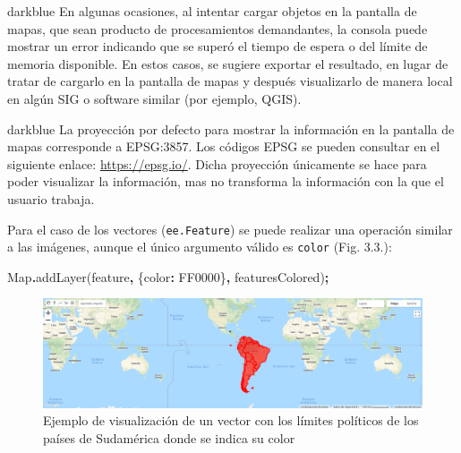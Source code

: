 \documentclass[
  12pt,
  letterpaper,
  twoside]{book}
\newenvironment{Shaded}{\begin{snugshade}}{\end{snugshade}}
\newcommand{\BuiltInTok}[1]{#1}
\newcommand{\DataTypeTok}[1]{\textcolor[rgb]{0.13,0.29,0.53}{#1}}
\newcommand{\FunctionTok}[1]{\textcolor[rgb]{0.00,0.00,0.00}{#1}}
\newcommand{\NormalTok}[1]{#1}
\newcommand{\OperatorTok}[1]{\textcolor[rgb]{0.81,0.36,0.00}{\textbf{#1}}}
\newcommand{\StringTok}[1]{\textcolor[rgb]{0.31,0.60,0.02}{#1}}
\begin{document}
\begin{bluebox2}

\begin{awesomeblock}{5pt}{\faLightbulb}{darkblue}
En algunas ocasiones, al intentar cargar objetos en la pantalla de mapas, que sean producto de procesamientos demandantes, la consola puede mostrar un error indicando que se superó el tiempo de espera o del límite de memoria disponible. En estos casos, se sugiere exportar el resultado, en lugar de tratar de cargarlo en la pantalla de mapas y después visualizarlo de manera local en algún SIG o software similar (por ejemplo, QGIS).

\end{awesomeblock}

\end{bluebox2}

\begin{bluebox2}

\begin{awesomeblock}{5pt}{\faLightbulb}{darkblue}
La proyección por defecto para mostrar la información en la pantalla de mapas corresponde a EPSG:3857. Los códigos EPSG se pueden consultar en el siguiente enlace: \url{https://epsg.io/}. Dicha proyección únicamente se hace para poder visualizar la información, mas no transforma la información con la que el usuario trabaja.

\end{awesomeblock}

\end{bluebox2}

Para el caso de los vectores (\texttt{ee.Feature}) se puede realizar una operación similar a las imágenes, aunque el único argumento válido es \texttt{color} (Fig. 3.3.):

\begin{Shaded}
\begin{Highlighting}[]
\BuiltInTok{Map}\OperatorTok{.}\FunctionTok{addLayer}\NormalTok{(feature}\OperatorTok{,}\NormalTok{ \{}\DataTypeTok{color}\OperatorTok{:} \StringTok{\textquotesingle{}FF0000\textquotesingle{}}\NormalTok{\}}\OperatorTok{,} \StringTok{\textquotesingle{}featuresColored\textquotesingle{}}\NormalTok{)}\OperatorTok{;}
\end{Highlighting}
\end{Shaded}

\begin{figure}[btp]

{\centering \includegraphics[width=1\linewidth]{Img/SAmerica} 

}

\caption{Ejemplo de visualización de un vector con los límites políticos de los países de Sudamérica donde se indica su color}\label{fig:unnamed-chunk-29}
\end{figure}
\end{document}
